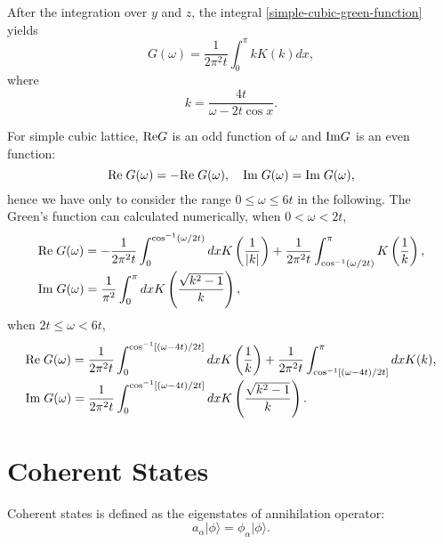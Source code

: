 \documentclass{book}
\newcommand{\ket}[1]{{|#1\rangle}}
\renewcommand{\Re}{{\rm Re}}
\renewcommand{\Im}{{\rm Im}}
\numberwithin{equation}{section}
\begin{document}
After the integration over $y$ and $z$, the integral
\eqref{simple-cubic-green-function} yields 
\begin{equation}
  G(\omega)=\frac{1}{2\pi^2t}\int_0^\pi kK(k)dx,
\end{equation}
where
\begin{equation}
  k=\frac{4t}{\omega-2t\cos x}.
\end{equation}

For simple cubic lattice, $\Re G$ is an odd function of $\omega$ and
$\Im G$ is an even function:
\begin{equation}
  \Re\;G(\omega)=-\Re\;G(\omega),\quad \Im\;G(\omega)=\Im\;G(\omega),
\end{equation}
hence we have only to consider the range $0\le\omega\le6t$ in the
following. The Green's function can calculated numerically, when $0<\omega<2t$,
\begin{equation}
  \begin{array}{l}
    \displaystyle\Re\;G(\omega)=-\frac{1}{2\pi^2t}\int_0^{\cos^{-1}(\omega/2t)}
    dxK\left(\frac{1}{|k|}\right)+\frac{1}{2\pi^2t}
    \int_{\cos^{-1}(\omega/2t)}^{\pi}K\left(\frac{1}{k}\right),\\\vbox
    to 20pt{} \displaystyle\Im\;G(\omega)=\frac{1}{\pi^2}\int_0^\pi
    dxK \left(\frac{\sqrt{k^2-1}}{k}\right),\\
  \end{array}
\end{equation}
when $2t\le\omega<6t$,
\begin{equation}
  \begin{array}{l}
    \displaystyle\Re\;G(\omega)=\frac{1}{2\pi^2t}
    \int_0^{\cos^{-1}[(\omega-4t)/2t]}dxK\left(\frac{1}{k}\right)
    +\frac{1}{2\pi^2t}\int_{\cos^{-1}[(\omega-4t)/2t]}^\pi dxK(k),\\\vbox to 20pt{}
    \displaystyle\Im\;G(\omega)=\frac{1}{2\pi^2t}
    \int_0^{\cos^{-1}[(\omega-4t)/2t]}dx K\left(\frac{\sqrt{k^2-1}}{k}\right).\\
  \end{array}
\end{equation}

\chapter{Coherent States}
Coherent states is defined as the eigenstates of annihilation operator:
\begin{equation}
  a_\alpha\ket{\phi}=\phi_\alpha\ket{\phi}.
\end{equation}
\end{document}
